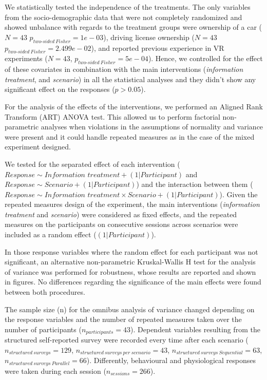 We statistically tested the independence of the treatments. The only variables from the socio-demographic data that were not completely randomized and showed unbalance with regards to the treatment groups were ownership of a car ($N=43$ $p_{two\text{-}sided\ Fisher}=1e-03$), driving license ownership ($N=43$ $p_{two\text{-}sided\ Fisher}=2.499e-02$), and reported previous experience in VR experiments ($N=43$, $p_{two\text{-}sided\ Fisher}=5e-04$). Hence, we controlled for the effect of these covariates in combination with the main interventions (\emph{information treatment}, and \emph{scenario}) in all the statistical analyses and they didn't show any significant effect on the responses ($p>0.05$).

For the analysis of the effects of the interventions, we performed an Aligned Rank Transform (ART) ANOVA test. This allowed us to perform factorial non-parametric analyses when violations in the assumptions of normality and variance were present and it could handle repeated measures \cite{Wobbrock2011} as in the case of the mixed experiment designed. 

We tested for the separated effect of each intervention ($\textit{Response} \sim \textit{Information treatment} + (1|\textit{Participant})$ and $\textit{Response} \sim \textit{Scenario} + (1|\textit{Participant})$) and the interaction between them ($\textit{Response} \sim \textit{Information treatment} \times \textit{Scenario} + (1|\textit{Participant})$). Given the repeated measures design of the experiment, the main interventions (\emph{information treatment} and \emph{scenario}) were considered as fixed effects, and the repeated measures on the participants on consecutive sessions across scenarios were included as a random effect ($(1|\textit{Participant})$).

In those response variables where the random effect for each participant was not significant, an alternative non-parametric Kruskal-Wallis H test for the analysis of variance\cite{Kruskal1952} was performed for robustness, whose results are reported and shown in figures. No differences regarding the significance of the main effects were found between both procedures.

The sample size (n) for the omnibus analysis of variance changed depending on the response variables and the number of repeated measures taken over the number of participants ($n_{participants}=43$). Dependent variables resulting from the structured self-reported survey were recorded every time after each scenario ($n_{structured\ surveys}=129$, $n_{structured\ surveys\ per\ scenario}=43$, $n_{structured\ surveys\ Sequential}=63$, $n_{structured\ surveys\ Parallel}=66$). Differently, behavioural and physiological responses were taken during each session ($n_{sessions}=266$).

